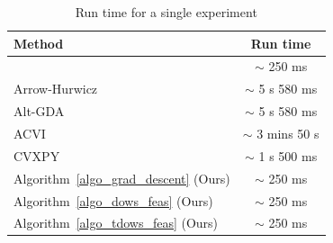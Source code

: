 \documentclass{article}
\theoremstyle{plain}
\theoremstyle{definition}
\theoremstyle{remark}
\begin{document}
\begin{table}[h!]
\centering
\caption{Run time for a single experiment} \label{tab_runtime}
\begin{tabular}{l c}
\hline
\textbf{Method} & \textbf{Run time} \\
\hline
\cite{nedic2019random} & $\sim$ 250 ms \\
Arrow-Hurwicz~\cite{he2022convergence} & $\sim$ 5 s 580 ms \\
Alt-GDA~\cite{zhang2022near} & $\sim$ 5 s 580 ms \\
ACVI~\cite{yang2022solving} & $\sim$ 3 mins 50 s \\
CVXPY & $\sim$ 1 s 500 ms \\
Algorithm~\ref{algo_grad_descent} (Ours) & $\sim$ 250 ms \\
Algorithm~\ref{algo_dows_feas} (Ours) & $\sim$ 250 ms \\
Algorithm~\ref{algo_tdows_feas} (Ours) & $\sim$ 250 ms \\
\hline
\end{tabular}
\end{table}



\end{document}

